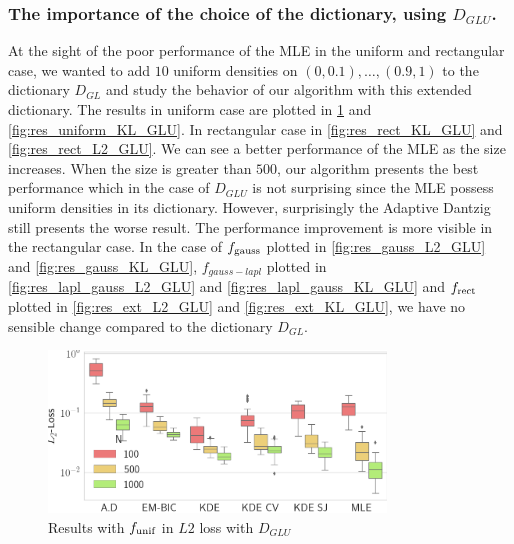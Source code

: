 \subsubsection{The importance of the choice of the dictionary, using $D_{GLU}$. \label{dict_dglu_sect}}
At the sight of the poor performance of the MLE in the uniform and rectangular case, we wanted to add $10$ uniform densities on $(0,0.1),\dots,(0.9,1)$ to the dictionary $D_{GL}$ and study the behavior of our algorithm with this extended dictionary. The results in uniform case are plotted in \cref{fig:res_uniform_L2_GLU} and \cref{fig:res_uniform_KL_GLU}. In rectangular case in \cref{fig:res_rect_KL_GLU} and \cref{fig:res_rect_L2_GLU}. We can see a better performance of the MLE as the size increases. When the size is greater than $500$, our algorithm presents the best performance which in the case of $D_{GLU}$ is not surprising since the MLE possess uniform densities in its dictionary. However, surprisingly the Adaptive Dantzig still presents the worse result. The performance improvement is more visible in the rectangular case. In the case of $f_{\textnormal{gauss}}$ plotted in \cref{fig:res_gauss_L2_GLU} and \cref{fig:res_gauss_KL_GLU}, $f_{gauss-lapl}$ plotted in \cref{fig:res_lapl_gauss_L2_GLU} and \cref{fig:res_lapl_gauss_KL_GLU} and $f_{\textnormal{rect}}$ plotted in \cref{fig:res_ext_L2_GLU} and \cref{fig:res_ext_KL_GLU}, we have no sensible change compared to the dictionary $D_{GL}$.
\begin{figure}
\center
    \includegraphics[width=0.8\textwidth]{./TeX_files/res_uniform_L2_GLU.png}
    \caption{Results with $f_{\textnormal{unif}}$ in $L2$ loss with $D_{GLU}$}
    \label{fig:res_uniform_L2_GLU}
\end{figure}

